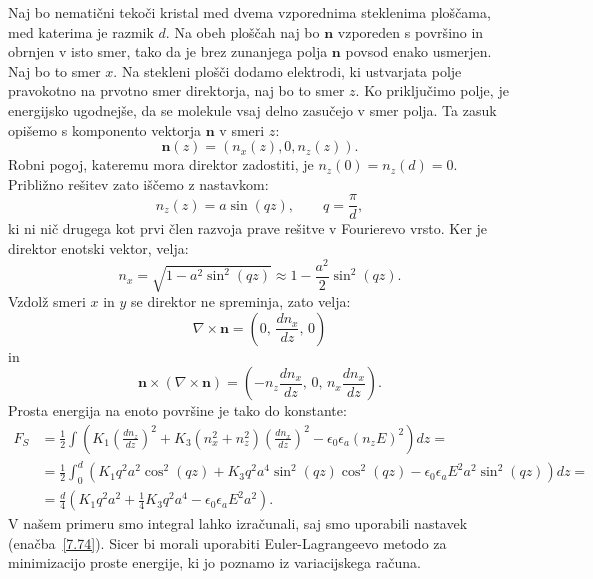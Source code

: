 Naj bo nematični tekoči kristal med dvema vzporednima
steklenima ploščama, med katerima je razmik $d$. Na obeh ploščah naj bo $\mathbf{n}$ vzporeden
s površino in obrnjen v isto smer, tako da je brez zunanjega 
polja $\mathbf{n}$ povsod enako usmerjen. Naj bo to smer $x$.
Na stekleni plošči dodamo elektrodi, ki ustvarjata polje pravokotno na 
prvotno smer direktorja, naj bo to smer $z$.
Ko priključimo polje, je energijsko ugodnejše, da
se molekule vsaj delno zasučejo v smer polja. Ta zasuk opišemo s
komponento vektorja $\mathbf{n}$ v smeri $z$:
\begin{equation}
\mathbf{n}(z)=(n_{x}(z),0,n_{z}(z)).
\label{7.73}
\end{equation}
Robni pogoj, kateremu mora direktor zadostiti,
je $n_{z}(0)=n_{z}(d)=0$. Približno rešitev zato iščemo z nastavkom: 
\begin{equation}
n_{z}(z)=a\sin (qz), \qquad q=\frac{\pi}{d},
\label{7.74}
\end{equation}
ki ni nič drugega kot prvi člen razvoja prave rešitve v Fourierevo vrsto.
Ker je direktor enotski vektor, velja:
\begin{equation}
n_x = \sqrt{1-a^2\sin^2(qz)} \approx 1 - \frac{a^2}{2}\sin^2(qz).
\end{equation}
Vzdolž smeri $x$ in $y$ se direktor ne spreminja, zato velja:
\begin{equation}
\nabla\times\mathbf{n}=\left(0,\,\frac{dn_{x}}{dz},\,0\right)
\label{7.75}
\end{equation}
 in 
\begin{equation}
\mathbf{n}\times(\nabla\times\mathbf{n})=\left(-n_{z}\frac{dn_{x}}{dz},\,0,\,
n_{x}\frac{dn_{x}}{dz}\right)\!\!.
\label{7.76}
\end{equation}
Prosta energija na enoto površine je tako do konstante:
\begin{align}
F_S & =  \frac{1}{2}\int\left(K_{1}\left(\frac{dn_{z}}{dz}\right)^{2}+
K_{3}\left(n_x^2+n_{z}^{2}\right) \left(\frac{dn_{x}}{dz}\right)^{2}-
\epsilon_{0}\epsilon_{a}(n_{z}E)^{2}\right)dz=\nonumber \\
 & =  \frac{1}{2}\int_{0}^{d}
 \left(K_{1}q^{2}a^{2}\cos^{2}(qz)+K_{3}q^{2}a^{4}\sin^{2}(qz)\cos^2(qz)-
 \epsilon_{0}\epsilon_{a}E^2a^{2}\sin^{2}(qz)\right)dz=\nonumber \\
 & =  \frac{d}{4}\left( K_{1}q^{2}a^2+\frac{1}{4}K_{3}q^{2}a^4-\epsilon_{0}\epsilon_{a}E^2a^2\right)\!\!.
\end{align}
V našem primeru smo integral lahko izračunali, saj smo uporabili nastavek (enačba~\ref{7.74}).
Sicer bi morali uporabiti Euler-Lagrangeevo metodo za minimizacijo proste energije, ki 
jo poznamo iz variacijskega računa.

